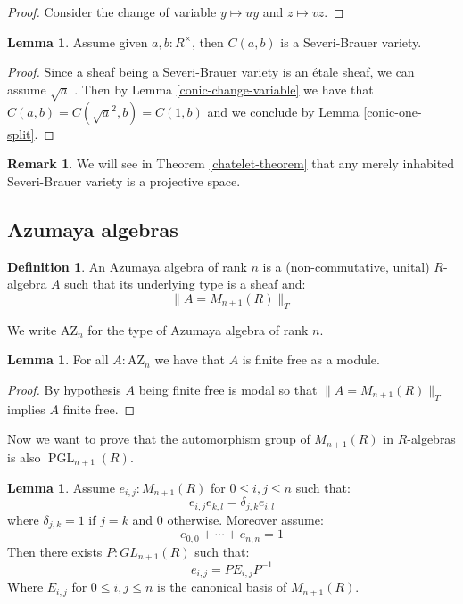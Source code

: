 \documentclass[10pt,a4paper]{article}
\theoremstyle{definition}
\newtheorem{lemma}[theorem]{Lemma}
\newtheorem{definition}[theorem]{Definition}
\newtheorem{remark}[theorem]{Remark}
\DeclareMathOperator{\PGL}{PGL}
\newcommand{\AZ}{\mathrm{AZ}}
\newcommand{\propTrunc}[1]{\lVert #1 \rVert}
\begin{document}
\begin{proof}
Consider the change of variable $y\mapsto uy$ and $z\mapsto vz$.
\end{proof}

\begin{lemma}
Assume given $a,b:R^\times$, then $C(a,b)$ is a Severi-Brauer variety.
\end{lemma}

\begin{proof}
Since a sheaf being a Severi-Brauer variety is an \'etale sheaf, we can assume $\sqrt{a}$ . Then by Lemma \ref{conic-change-variable} we have that $C(a,b) = C(\sqrt{a}^2,b) = C(1,b)$ and we conclude by Lemma \ref{conic-one-split}.
\end{proof}

\begin{remark}
We will see in Theorem \ref{chatelet-theorem} that any merely inhabited Severi-Brauer variety is a projective space. 
\end{remark}


\subsection{Azumaya algebras}

\begin{definition}
An Azumaya algebra of rank $n$ is a (non-commutative, unital) $R$-algebra $A$ such that its underlying type is a sheaf and:
\[\propTrunc{A=M_{n+1}(R)}_T\]
\end{definition}

We write $\AZ_n$ for the type of Azumaya algebra of rank $n$.

\begin{lemma}\label{azumayas-are-finite-free}
For all $A:\AZ_n$ we have that $A$ is finite free as a module.
\end{lemma}

\begin{proof}
By hypothesis $A$ being finite free is modal so that $\propTrunc{A=M_{n+1}(R)}_T$ implies $A$ finite free.
\end{proof}

Now we want to prove that the automorphism group of $M_{n+1}(R)$ in $R$-algebras is also $\PGL_{n+1}(R)$.

\begin{lemma}\label{fundamental-system-matrices}
Assume $e_{i,j}:M_{n+1}(R)$ for $0\leq i,j\leq n$ such that:
\[e_{i,j}e_{k,l} = \delta_{j,k}e_{i,l}\]
where $\delta_{j,k} = 1$ if $j=k$ and $0$ otherwise. Moreover assume:
\[e_{0,0}+\cdots+e_{n,n}=1\]
Then there exists $P:GL_{n+1}(R)$ such that:
\[e_{i,j} = PE_{i,j}P^{-1}\]
Where $E_{i,j}$ for $0\leq i,j\leq n$ is the canonical basis of $M_{n+1}(R)$.
\end{lemma}
\end{document}
